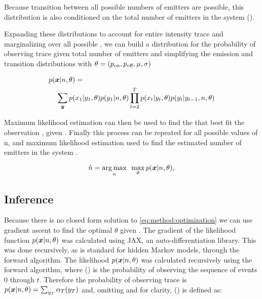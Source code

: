 Because transition between all possible numbers of emitters are possible, this distribution is also conditioned on the total number of emitters in the system (\n).

Expanding these distributions to account for entire intensity trace \trace and marginalizing over all possible \states, we can build a distribution for the probability of observing trace \trace given total number of emitters \n and simplifying the emission and transition distributions with $\theta = (p_\text{on}, p_\text{off}, \mu, \sigma)$

\begin{align*}
  p(\bm{x}|n,\theta) &=\\
    \sum_{\bm{y}}
      p(&x_{1}|y_{1}, \theta)
      p(y_{1}|n, \theta)
      \prod_{t=2}^{T}
        p(x_{t}|y_{t}, \theta)
        p(y_{t}|y_{t-1},n, \theta)
  \label{eq:method:likelihood}
\end{align*}

Maximum likelihood estimation can then be used to find the \parameters that best fit the observation \trace, given \n. 
Finally this process can be repeated for all possible values of n, and maximum likelihood estimation used to find the estimated number of emitters in the system \estimatedn.

\begin{equation}
    \hat{n} =
    \mathop{\arg\max}_{n}\hspace{0.5em}
    \max_\theta
    p(\bm{x}|n,\theta)
  \text{,}
  \label{eq:method:optimization}
\end{equation}

\subsection{Inference}


Because there is no closed form solution to  \eqref{eq:method:optimization} we can use gradient ascent to find the optimal $\theta$ given \n.
The gradient of the likelihood function $p(\bm{x} | n, \theta)$ was calculated using JAX, an auto-differentiation library.
This was done recursively, as is standard for hidden Markov models, through the forward algorithm.
The likelihood $p(\bm{x} | n, \theta)$ was calculated recursively using the forward algorithm, where \pchain() is the probability of observing the sequence of events 0 through $t$.
Therefore the probability of observing trace \trace is $ p(\bm{x}|n,\theta) = \sum_{y_{T}} \alpha_T(y_{T})$ and, omitting \n and \parameters for clarity, \pchain()  is defined as:

